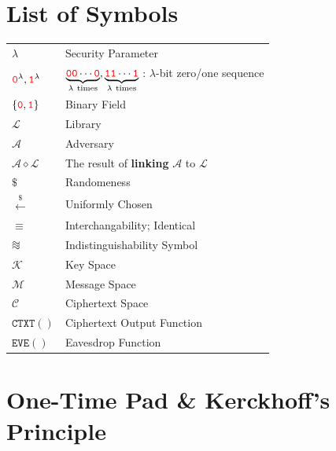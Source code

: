 \documentclass[12pt,openany]{book}
\theoremstyle{definition}
\newcommand{\keyspace}{\mathcal{K}}
\newcommand{\messagespace}{\mathcal{M}}
\newcommand{\ciphertextspace}{\mathcal{C}}
\newcommand{\library}{\mathcal{L}}
\newcommand{\zero}{\textcolor{red}{\texttt{0}}}
\newcommand{\one}{\textcolor{red}{\texttt{1}}}
\newcommand{\adversary}{\mathcal{A}}
\newcommand{\linking}{\diamond}
\newcommand{\randomness}{\$}
\newcommand{\uniform}{\xleftarrow{\randomness}}
\newcommand{\binaryfield}{\set{\zero,\one}}
\newcommand*{\indist}{%
	\mathrel{\vcenter{\offinterlineskip
			\hbox{$\sim$}\vskip-.35ex\hbox{$\sim$}\vskip-.35ex\hbox{$\sim$}}}}
\begin{document}
	\newpage
	\tableofcontents
	
	\mainmatter
	
	\chapter*{List of Symbols}
	
	\begin{tabular}{ll}
		\( \lambda \) & Security Parameter \\
		\( \zero^\lambda, \one^\lambda\) & \(\underbrace{\zero\zero\cdots\zero}_{\lambda\ \text{times}}, \underbrace{\one\one\cdots\one}_{\lambda\ \text{times}}\) : \(\lambda\)-bit zero/one sequence \\
		\( \binaryfield \) & Binary Field \\
		\( \library \) & Library \\
		\( \adversary \) & Adversary \\		
		\( \adversary\linking\library \) & The result of \textbf{linking} $\adversary$ to  $\library$ \\
		\( \randomness \) & Randomeness \\
		\( \uniform \) & Uniformly Chosen \\
		\( \equiv \) & Interchangability; Identical\\
		\( \indist \) & Indistinguishability Symbol\\
		\( \keyspace \) & Key Space\\
		\( \messagespace \) & Message Space\\
		\( \ciphertextspace \) & Ciphertext Space\\
		\( \texttt{CTXT}() \) & Ciphertext Output Function\\
		\( \texttt{EVE}() \) & Eavesdrop Function\\
	\end{tabular}
	
	\chapter{One-Time Pad \& Kerckhoff's Principle}
	
\end{document}

